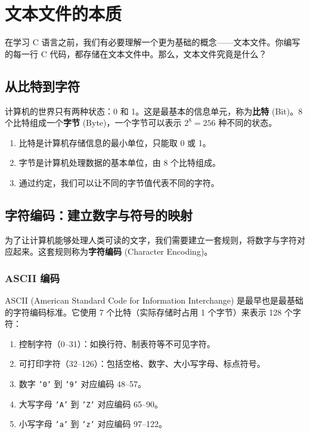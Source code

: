 \section{文本文件的本质}
\label{sec:text_file_essence}

在学习 C 语言之前，我们有必要理解一个更为基础的概念——文本文件。你编写的每一行 C 代码，都存储在文本文件中。那么，文本文件究竟是什么？

\subsection{从比特到字符}
\label{subsec:bits_to_chars}

计算机的世界只有两种状态：0 和 1。这是最基本的信息单元，称为\textbf{比特} (Bit)。8 个比特组成一个\textbf{字节} (Byte)，一个字节可以表示 $2^8 = 256$ 种不同的状态。

\begin{enumerate}[label={(\arabic*)}]
    \item 比特是计算机存储信息的最小单位，只能取 0 或 1。
    \item 字节是计算机处理数据的基本单位，由 8 个比特组成。
    \item 通过约定，我们可以让不同的字节值代表不同的字符。
\end{enumerate}

\subsection{字符编码：建立数字与符号的映射}
\label{subsec:char_encoding}

为了让计算机能够处理人类可读的文字，我们需要建立一套规则，将数字与字符对应起来。这套规则称为\textbf{字符编码} (Character Encoding)。

\subsubsection{ASCII 编码}

ASCII (American Standard Code for Information Interchange) 是最早也是最基础的字符编码标准。它使用 7 个比特（实际存储时占用 1 个字节）来表示 128 个字符：

\begin{enumerate}[label={(\arabic*)}]
    \item 控制字符（0--31）：如换行符、制表符等不可见字符。
    \item 可打印字符（32--126）：包括空格、数字、大小写字母、标点符号。
    \item 数字 \texttt{'0'} 到 \texttt{'9'} 对应编码 48--57。
    \item 大写字母 \texttt{'A'} 到 \texttt{'Z'} 对应编码 65--90。
    \item 小写字母 \texttt{'a'} 到 \texttt{'z'} 对应编码 97--122。
\end{enumerate}

